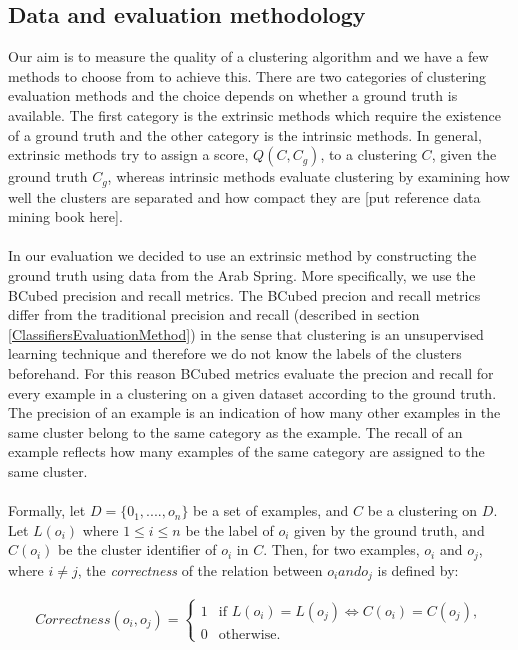 \subsection{Data and evaluation methodology}\label{ClusteringEvaluationMethod}
Our aim is to measure the quality of a clustering algorithm and we have a few methods to choose from to achieve this. There are two categories of clustering evaluation methods and the choice depends
on whether a ground truth is available. The first category is the extrinsic methods which require the existence of a ground truth and the other category is the intrinsic methods. In general, extrinsic methods try to assign a score, $Q(C, C_g)$, to a clustering $C$, given the ground truth $C_g$, whereas intrinsic methods evaluate clustering by examining how well the clusters are separated and how compact they are [put reference data mining book here].\\\\ 
In our evaluation we decided to use an extrinsic method by constructing the ground truth using data from the Arab Spring. More specifically, we use the BCubed precision and recall metrics. The BCubed precion and recall metrics differ from the traditional precision and recall (described in section \ref{ClassifiersEvaluationMethod}) in the sense that clustering is an unsupervised learning technique and therefore we do not know the labels of the clusters beforehand. For this reason BCubed metrics evaluate the precion and recall for every example in a clustering on a given dataset according to the ground truth. The precision of an example is an indication of how many other examples in the same cluster belong to the same category as the example. The recall of an example reflects how many examples of the same category are assigned to the same cluster.\\\\ 
Formally, let $D = \{ 0_1,....,o_n \}$ be a set of examples, and $C$ be a clustering on $D$. Let $L(o_i)$ where $1 \leq i \leq n$ be the label of $o_i$ given by the ground truth, and $C(o_i)$ be the cluster identifier of $o_i$ in $C$. Then, for two examples, $o_i$ and $o_j$, where $i \neq j$, the \emph{correctness} of the relation between $o_i and o_j$ is defined by:

\begin{eqnarray}
Correctness(o_i, o_j) = \begin{cases}
                          1& \text{if $L(o_i) = L(o_j) \Leftrightarrow C(o_i) = C(o_j) $},\\
                          0& \text{otherwise}.
                        \end{cases}
\end{eqnarray} 

